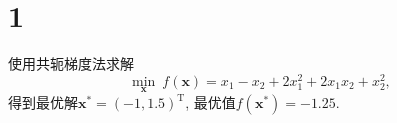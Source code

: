 \section*{1}

使用共轭梯度法求解
\begin{equation*}
    \min_{\bm{x}} ~ f(\bm{x})=x_1-x_2+2x_1^2+2x_1x_2+x_2^2,
\end{equation*}
得到最优解$\bm{x}^*=(-1, 1.5)^\mathrm{T}$, 最优值$f(\bm{x}^*)=-1.25$.
